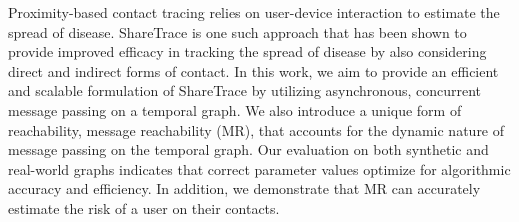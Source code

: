 % 
% 
%
Proximity-based contact tracing relies on user-device interaction to estimate the spread of disease. ShareTrace is one such approach that has been shown to provide improved efficacy in tracking the spread of disease by also considering direct and indirect forms of contact. In this work, we aim to provide an efficient and scalable formulation of ShareTrace by utilizing asynchronous, concurrent message passing on a temporal graph. We also introduce a unique form of reachability, message reachability (MR), that accounts for the dynamic nature of message passing on the temporal graph. Our evaluation on both synthetic and real-world graphs indicates that correct parameter values optimize for algorithmic accuracy and efficiency. In addition, we demonstrate that MR can accurately estimate the risk of a user on their contacts.
